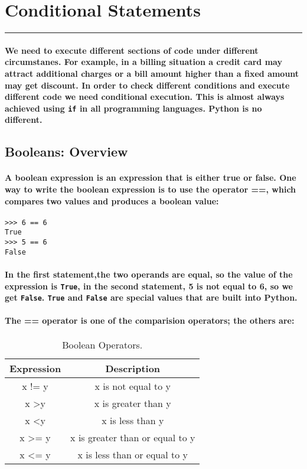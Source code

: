 \documentclass{book}
\begin{document}
\section*{Conditional Statements}

\hrule

\paragraph{We need to execute different sections of code under different circumstanes. For example, in a
billing situation a credit card may attract additional charges or a bill amount higher than a fixed
amount may get discount. In order to check different conditions and execute different code we need
conditional execution. This is almost always achieved using \texttt{if} in all programming languages. Python
is no different.}
\subsection*{Booleans: Overview}
\paragraph{A boolean expression is an expression that is either true or false. One way to write the boolean
expression is to use the operator ==, which compares two values and produces a boolean value:}
\begin{verbatim}
>>> 6 == 6
True
>>> 5 == 6
False
\end{verbatim}

\paragraph{In the first statement,the two operands are equal, so the value of the expression is \texttt{True}, in the second statement, 5 is not equal to 6, so we get \texttt{False}. \texttt{True} and \texttt{False} are special values that are built into Python.}

\paragraph{The == operator is one of the comparision operators; the others are:}

\begin{table}[h!]
  \begin{center}
    \label{tab:table1}
    \begin{tabular}{|c|c|} 
      \toprule
      \textbf{Expression} & \textbf{Description}\\
      \hline
      x != y & x is not equal to y \\
      x \textgreater  y  & x is greater than y \\
      x \textless	y  & x is less than y \\
      x \textgreater = y & x is greater than or equal to y \\
      x \textless = y & x is less than or equal to y \\
       \bottomrule
    \end{tabular}
  \end{center}
  \caption{Boolean Operators.}
\end{table}
\end{document}
